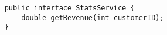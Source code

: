 \begin{verbatim}
    public interface StatsService {
        double getRevenue(int customerID);
    }
\end{verbatim}